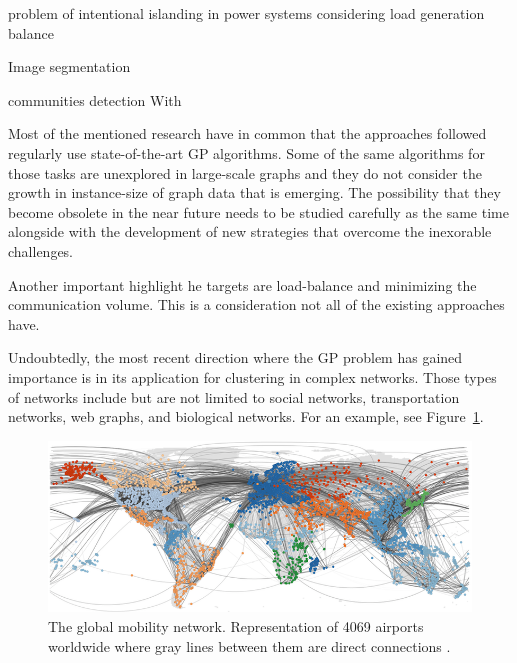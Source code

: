 problem of intentional islanding in power systems considering load generation balance ~\cite{islanding}

Image segmentation~\cite{imagesegmentation}

communities detection
With

Most of the mentioned research have in common that the approaches followed regularly use state-of-the-art GP algorithms. Some of the same algorithms for those tasks are unexplored in large-scale graphs and they do not consider the growth in instance-size of graph data that is emerging. The possibility that they become obsolete in the near future needs to be studied carefully as the same time alongside with the development of new strategies that overcome the inexorable challenges.

Another important highlight he targets are load-balance and minimizing the communication volume. This is a consideration not all of the existing approaches have.

Undoubtedly, the most recent direction where the GP problem has gained importance is in its application for clustering in complex networks. Those types of networks include but are not limited to social networks, transportation networks, web graphs, and biological networks. For an example, see Figure~\ref{fig:complexnetwork}.

\begin{figure}[h!]
    \centering
    \includegraphics[scale=0.5]{complex_networks.png}
    \caption{The global mobility network. Representation of 4069 airports worldwide where gray lines between them are direct connections \cite{complexnetworks}.}
    \label{fig:complexnetwork}
\end{figure}

